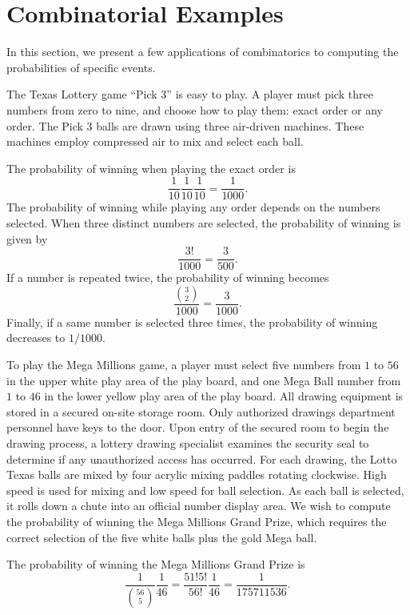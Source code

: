 \section{Combinatorial Examples}

In this section, we present a few applications of combinatorics to computing the probabilities of specific events.

\begin{example}
The Texas Lottery game ``Pick $3$'' is easy to play.
A player must pick three numbers from zero to nine, and choose how to play them: exact order or any order.
The Pick $3$ balls are drawn using three air-driven machines.
These machines employ compressed air to mix and select each ball.

The probability of winning when playing the exact order is
\begin{equation*}
\frac{1}{10} \frac{1}{10} \frac{1}{10}
= \frac{1}{1000} .
\end{equation*}
The probability of winning while playing any order depends on the numbers selected.
When three distinct numbers are selected, the probability of winning is given by
\begin{equation*}
\frac{3!}{1000} = \frac{3}{500} .
\end{equation*}
If a number is repeated twice, the probability of winning becomes
\begin{equation*}
\frac{\binom{3}{2}}{1000} = \frac{3}{1000} .
\end{equation*}
Finally, if a same number is selected three times, the probability of winning decreases to $1/1000$.
\end{example}

\begin{example}
To play the Mega Millions game, a player must select five numbers from $1$ to $56$ in the upper white play area of the play board, and one Mega Ball number from $1$ to $46$ in the lower yellow play area of the play board.
All drawing equipment is stored in a secured on-site storage room.
Only authorized drawings department personnel have keys to the door.
Upon entry of the secured room to begin the drawing process, a lottery drawing specialist examines the security seal to determine if any unauthorized access has occurred.
For each drawing, the Lotto Texas balls are mixed by four acrylic mixing paddles rotating clockwise.
High speed is used for mixing and low speed for ball selection.
As each ball is selected, it rolls down a chute into an official number display area.
We wish to compute the probability of winning the Mega Millions Grand Prize, which requires the correct selection of the five white balls plus the gold Mega ball.

The probability of winning the Mega Millions Grand Prize is
\begin{equation*}
\frac{1}{\binom{56}{5}} \frac{1}{46}
= \frac{51!5!}{56!} \frac{1}{46}
= \frac{1}{175 711 536} .
\end{equation*}
\end{example}


